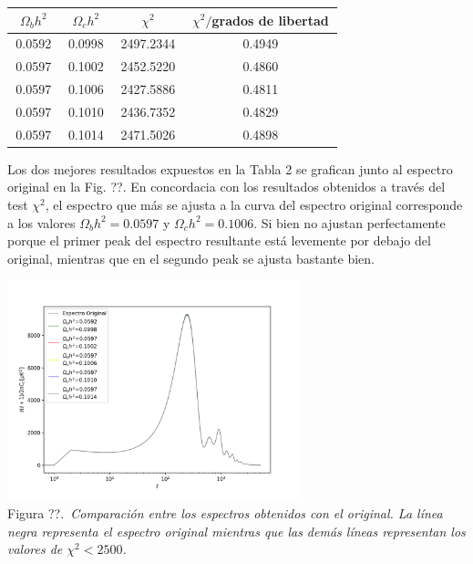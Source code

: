 \documentclass[twocolumn,letterpaper,spanish]{revtex4}
\numberwithin{equation}{section}
\begin{document}
\begin{center}
\begin{tabular}{| c | c | c | c |}\hline
$\Omega_b h^2$ & $\Omega_c h^2$ & $\chi^2$ & \,$\chi^2/$grados de libertad\,       \\ \hline
	\,0.0592\,   & \,0.0998\, & \,2497.2344\,   & 0.4949  \\
	0.0597   & 0.1002 & 2452.5220  & 0.4860  \\
	0.0597   & 0.1006 & 2427.5886  & 0.4811  \\
	0.0597   & 0.1010 & 2436.7352  & 0.4829  \\
	0.0597   & 0.1014 & 2471.5026  & 0.4898   \\\hline
\end{tabular}\label{tabla3}
\end{center}

Los dos mejores resultados expuestos en la Tabla 2 se grafican junto al espectro original en la Fig. ??. En concordacia con los resultados obtenidos a trav\'es del test $\chi^2$, el espectro que m\'as se ajusta a la curva del espectro original corresponde a los valores $\Omega_b h^2=0.0597$ y $\Omega_c h^2=0.1006$. Si bien no ajustan perfectamente porque el primer peak del espectro resultante est\'a levemente por debajo del original, mientras que en el segundo peak se ajusta bastante bien.

\begin{center}
   \includegraphics[width=85mm]{comparacion.png}\\
   Figura ??.\emph{\ Comparaci\'on entre los espectros obtenidos con el original. La l\'inea negra representa el espectro original mientras que las dem\'as l\'ineas representan los valores de $\chi^2<2500$.}%
\end{center}
\end{document}
